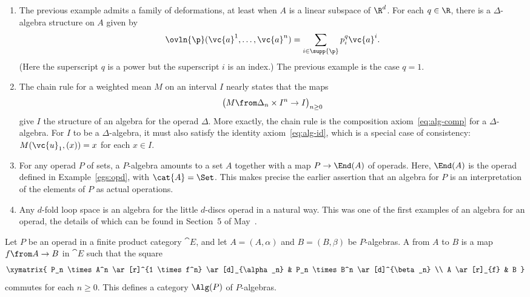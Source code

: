\begin{examples}
\begin{enumerate}
\item
{}
The previous example admits a family of deformations,%
%
% 
at least when $A$ is a linear subspace of $\R^d$.  For each $q \in \R$,
there is a $\Delta$-algebra structure on $A$ given by
\[
\ovln{\p}(\vc{a}^1, \ldots, \vc{a}^n)
=
\sum_{i \in \supp{\p}} p_i^q \vc{a}^i.
\]
(Here the superscript $q$ is a power but the superscript $i$ is an
index.)  The previous example is the case $q = 1$.

\item
The chain%
%
% 
rule for a weighted mean $M$ on an interval $I$ nearly states
that the maps
\[
\bigl(M \from \Delta_n \times I^n \to I\bigr)_{n \geq 0}
\]
give $I$ the structure of an algebra for the operad $\Delta$.  More
exactly, the chain rule is the composition axiom~\eqref{eq:alg-comp} for
a $\Delta$-algebra.  For $I$ to be a $\Delta$-algebra, it must also satisfy
the identity axiom~\eqref{eq:alg-id}, which is a special case of
consistency: $M(\vc{u}_1, (x)) = x$ for each $x \in I$.

\item
For any operad $P$ of sets, a $P$-algebra amounts to a set $A$ together
with a map $P \to \End(A)$ of operads.  Here, $\End(A)$%
%
%
% 
is the operad defined in Example~\ref{egs:opd}, with
$\cat{A} = \Set$.  
This makes precise the earlier assertion that an algebra for $P$ is an
interpretation of the elements of $P$ as actual operations.


\item
Any $d$-fold loop%
%
% 
space is an algebra for the little%
%
%
% 
$d$-discs operad in a natural way.  This was one of the first examples of
an algebra for an operad, the details of which can be found in Section~5 of
May~\cite{MayGIL}.%
%
\end{enumerate}
\end{examples}

Let $P$ be an operad in a finite product category $\cat{E}$, and let $A =
(A, \alpha)$ and $B = (B, \beta)$ be $P$-algebras.  A %
%
% 
from $A$ to $B$ is a map $f \from A \to B$ in $\cat{E}$
such that the square
\[
\xymatrix{
P_n \times A^n \ar[r]^{1 \times f^n} \ar[d]_{\alpha_n}  &
P_n \times B^n \ar[d]^{\beta_n} \\
A \ar[r]_{f}    &
B
}
\]
commutes for each $n \geq 0$.  This defines a category $\Alg(P)$
of $P$-algebras.

